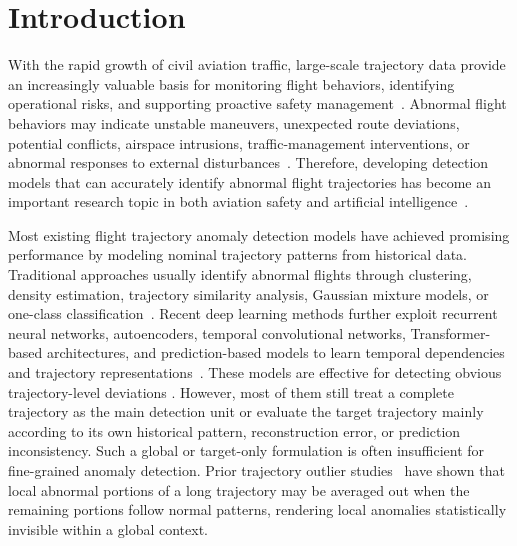 \documentclass[iicol,pdflatex,sn-basic,Numbered]{sn-jnl}%
\theoremstyle{thmstyleone}%
\theoremstyle{thmstyletwo}%
\theoremstyle{thmstylethree}%
\begin{document}

\maketitle

\section{Introduction}\label{sec:introduction}
With the rapid growth of civil aviation traffic, large-scale trajectory data provide an increasingly valuable basis for monitoring flight behaviors, identifying operational risks, and supporting proactive safety management~\cite{aerospace6110117}. 
Abnormal flight behaviors may indicate unstable maneuvers, unexpected route deviations, potential conflicts, airspace intrusions, traffic-management interventions, or abnormal responses to external disturbances~\cite{app12031295}. 
Therefore, developing detection models that can accurately identify abnormal flight trajectories has become an important research topic in both aviation safety and artificial intelligence~\cite{aerospace13030209,coelho2023analytics}.

Most existing flight trajectory anomaly detection models have achieved promising performance by modeling nominal trajectory patterns from historical data. 
Traditional approaches usually identify abnormal flights through clustering, density estimation, trajectory similarity analysis, Gaussian mixture models, or one-class classification~\cite{li2016gmm,diciccio2016detecting,olive:hal-02345597,9639966,olive2020significant,zhao2021incremental}. 
Recent deep learning methods further exploit recurrent neural networks, autoencoders, temporal convolutional networks, Transformer-based architectures, and prediction-based models to learn temporal dependencies and trajectory representations~\cite{doi:10.2514/1.I010941,chevrot2022cae,LUO2024103840,HUANG2025103478}. 
These models are effective for detecting obvious trajectory-level deviations . 
However, most of them still treat a complete trajectory as the main detection unit or evaluate the target trajectory mainly according to its own historical pattern, reconstruction error, or prediction inconsistency. 
Such a global or target-only formulation is often insufficient for fine-grained anomaly detection. 
Prior trajectory outlier studies~\cite{lee2008trajectory,yang2013trasmil,andrienko2018clustering} have shown that local abnormal portions of a long trajectory may be averaged out when the remaining portions follow normal patterns, rendering local anomalies statistically invisible within a global context.
\end{document}
